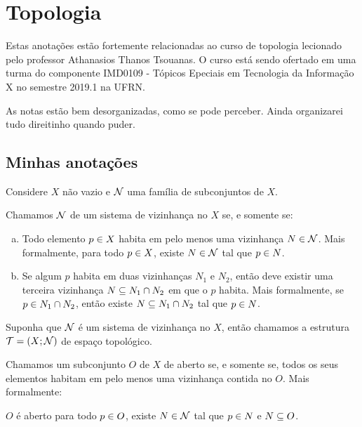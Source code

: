 \chapter{Topologia}
Estas anotações estão fortemente relacionadas ao curso de topologia lecionado pelo professor Athanasios Thanos Tsouanas. O curso está sendo ofertado em uma turma do componente IMD0109 - Tópicos Epeciais em Tecnologia da Informação X no semestre 2019.1 na UFRN.

As notas estão bem desorganizadas, como se pode perceber. Ainda organizarei tudo direitinho quando puder.

\section{Minhas anotações}

Considere $X$ não vazio e $\mathcal{N}$ uma família de subconjuntos de $X$. 

\begin{definition}
	Chamamos $\mathcal{N}$ de um sistema de vizinhança no $X$ se, e somente se:
\begin{enumerate}[a)]
\item
	Todo elemento $p \in X$ habita em pelo menos uma vizinhança $N \in \mathcal{N}$. Mais formalmente, para todo $p \in X$, existe $N \in \mathcal{N}$ tal que $p \in N$.

\item
	Se algum $p$ habita em duas vizinhanças $N_1$ e $N_2$, então deve existir uma terceira vizinhança $N \subseteq N_1 \cap N_2$ em que o $p$ habita. Mais formalmente, se $p \in N_1 \cap N_2$, então existe $N \subseteq N_1 \cap N_2$ tal que $p \in N$.
\end{enumerate}
\end{definition}

\begin{definition}
	Suponha que $\mathcal{N}$ é um sistema de vizinhança no $X$, então chamamos a estrutura $\mathcal{T} = (X ; \mathcal{N})$ de espaço topológico.
\end{definition}


\begin{definition}
	Chamamos um subconjunto $O$ de $X$ de aberto se, e somente se, todos os seus elementos habitam em pelo menos uma vizinhança contida no $O$. Mais formalmente:
	\begin{center}
		$O$ é aberto \sse para todo $p \in O$, existe $N \in \mathcal{N}$ tal que $p \in N$ e $N \subseteq O$.
	\end{center}
\end{definition}

